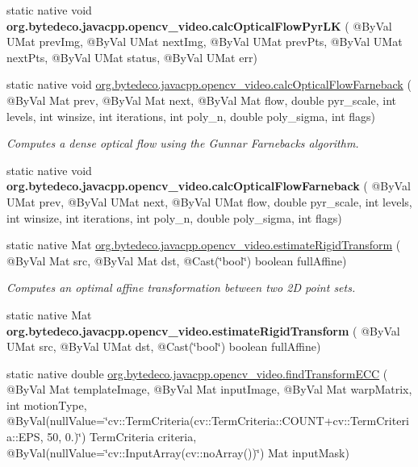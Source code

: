 \begin{DoxyCompactItemize}
static native void {\bfseries org.\+bytedeco.\+javacpp.\+opencv\+\_\+video.\+calc\+Optical\+Flow\+Pyr\+LK} ( @By\+Val U\+Mat prev\+Img, @By\+Val U\+Mat next\+Img, @By\+Val U\+Mat prev\+Pts, @By\+Val U\+Mat next\+Pts, @By\+Val U\+Mat status, @By\+Val U\+Mat err)
\item 
static native void \hyperlink{group__video__track_ga8296f2eaf7aa279b0c54a72350493258}{org.\+bytedeco.\+javacpp.\+opencv\+\_\+video.\+calc\+Optical\+Flow\+Farneback} ( @By\+Val Mat prev, @By\+Val Mat next, @By\+Val Mat flow, double pyr\+\_\+scale, int levels, int winsize, int iterations, int poly\+\_\+n, double poly\+\_\+sigma, int flags)
\begin{DoxyCompactList}\small\item\em Computes a dense optical flow using the Gunnar Farneback\textquotesingle{}s algorithm. \end{DoxyCompactList}\item 
\mbox{\label{group__video__track_ga1e5f670704e3d8ebddef930cdeabfad9}} 
static native void {\bfseries org.\+bytedeco.\+javacpp.\+opencv\+\_\+video.\+calc\+Optical\+Flow\+Farneback} ( @By\+Val U\+Mat prev, @By\+Val U\+Mat next, @By\+Val U\+Mat flow, double pyr\+\_\+scale, int levels, int winsize, int iterations, int poly\+\_\+n, double poly\+\_\+sigma, int flags)
\item 
static native Mat \hyperlink{group__video__track_ga2c14f71afdf82824dbdf781bbc041aa1}{org.\+bytedeco.\+javacpp.\+opencv\+\_\+video.\+estimate\+Rigid\+Transform} ( @By\+Val Mat src, @By\+Val Mat dst, @Cast(\char`\"{}bool\char`\"{}) boolean full\+Affine)
\begin{DoxyCompactList}\small\item\em Computes an optimal affine transformation between two 2D point sets. \end{DoxyCompactList}\item 
\mbox{\label{group__video__track_gad3794cdb1f9211d985bf3d571ff4aedd}} 
static native Mat {\bfseries org.\+bytedeco.\+javacpp.\+opencv\+\_\+video.\+estimate\+Rigid\+Transform} ( @By\+Val U\+Mat src, @By\+Val U\+Mat dst, @Cast(\char`\"{}bool\char`\"{}) boolean full\+Affine)
\item 
static native double \hyperlink{group__video__track_ga2438ed3ebc7ea014e11c93797e2aae7b}{org.\+bytedeco.\+javacpp.\+opencv\+\_\+video.\+find\+Transform\+E\+CC} ( @By\+Val Mat template\+Image, @By\+Val Mat input\+Image, @By\+Val Mat warp\+Matrix, int motion\+Type, @By\+Val(null\+Value=\char`\"{}cv\+::\+Term\+Criteria(cv\+::\+Term\+Criteria\+::\+C\+O\+U\+NT+cv\+::\+Term\+Criteria\+::\+E\+PS, 50, 0.)\char`\"{}) Term\+Criteria criteria, @By\+Val(null\+Value=\char`\"{}cv\+::\+Input\+Array(cv\+::no\+Array())\char`\"{}) Mat input\+Mask)

\end{DoxyCompactItemize}
